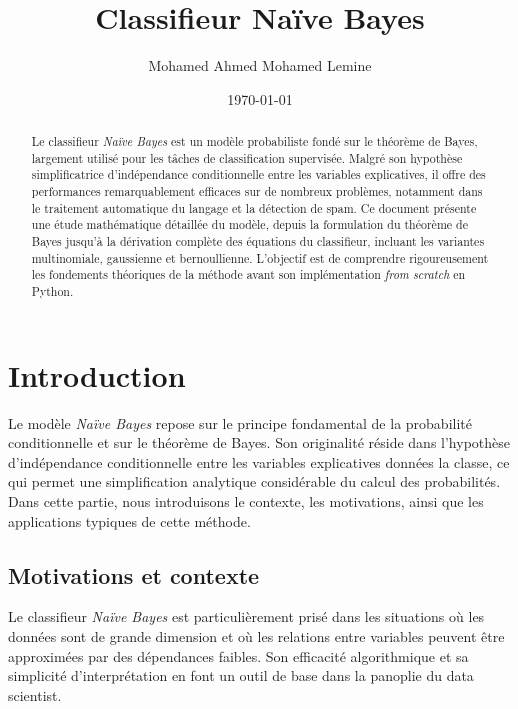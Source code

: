 \documentclass[12pt,a4paper]{article}
\title{\textbf{Classifieur Naïve Bayes}}
\author{Mohamed Ahmed Mohamed Lemine}
\date{\today}
\begin{document}
\maketitle

\begin{abstract}
Le classifieur \textit{Naïve Bayes} est un modèle probabiliste fondé sur le théorème de Bayes, largement utilisé pour les tâches de classification supervisée. 
Malgré son hypothèse simplificatrice d’indépendance conditionnelle entre les variables explicatives, il offre des performances remarquablement efficaces sur de nombreux problèmes, notamment dans le traitement automatique du langage et la détection de spam.  
Ce document présente une étude mathématique détaillée du modèle, depuis la formulation du théorème de Bayes jusqu’à la dérivation complète des équations du classifieur, incluant les variantes multinomiale, gaussienne et bernoullienne.  
L’objectif est de comprendre rigoureusement les fondements théoriques de la méthode avant son implémentation \textit{from scratch} en Python.
\end{abstract}

\vspace{1cm}

\tableofcontents
\newpage

\section{Introduction}

Le modèle \textit{Naïve Bayes} repose sur le principe fondamental de la probabilité conditionnelle et sur le théorème de Bayes. 
Son originalité réside dans l’hypothèse d’indépendance conditionnelle entre les variables explicatives données la classe, ce qui permet une simplification analytique considérable du calcul des probabilités.  
Dans cette partie, nous introduisons le contexte, les motivations, ainsi que les applications typiques de cette méthode.

\subsection{Motivations et contexte}
Le classifieur \textit{Naïve Bayes} est particulièrement prisé dans les situations où les données sont de grande dimension et où les relations entre variables peuvent être approximées par des dépendances faibles. 
Son efficacité algorithmique et sa simplicité d’interprétation en font un outil de base dans la panoplie du data scientist.
\end{document}
